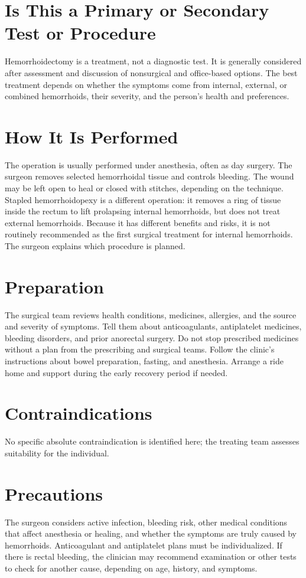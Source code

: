 \section*{Is This a Primary or Secondary Test or Procedure}
Hemorrhoidectomy is a treatment, not a diagnostic test. It is generally considered after assessment and discussion of nonsurgical and office-based options. The best treatment depends on whether the symptoms come from internal, external, or combined hemorrhoids, their severity, and the person's health and preferences.

\section*{How It Is Performed}
The operation is usually performed under anesthesia, often as day surgery. The surgeon removes selected hemorrhoidal tissue and controls bleeding. The wound may be left open to heal or closed with stitches, depending on the technique. Stapled hemorrhoidopexy is a different operation: it removes a ring of tissue inside the rectum to lift prolapsing internal hemorrhoids, but does not treat external hemorrhoids. Because it has different benefits and risks, it is not routinely recommended as the first surgical treatment for internal hemorrhoids. The surgeon explains which procedure is planned.

\section*{Preparation}
The surgical team reviews health conditions, medicines, allergies, and the source and severity of symptoms. Tell them about anticoagulants, antiplatelet medicines, bleeding disorders, and prior anorectal surgery. Do not stop prescribed medicines without a plan from the prescribing and surgical teams. Follow the clinic's instructions about bowel preparation, fasting, and anesthesia. Arrange a ride home and support during the early recovery period if needed.

\section*{Contraindications}
No specific absolute contraindication is identified here; the treating team assesses suitability for the individual.

\section*{Precautions}
The surgeon considers active infection, bleeding risk, other medical conditions that affect anesthesia or healing, and whether the symptoms are truly caused by hemorrhoids. Anticoagulant and antiplatelet plans must be individualized. If there is rectal bleeding, the clinician may recommend examination or other tests to check for another cause, depending on age, history, and symptoms.

